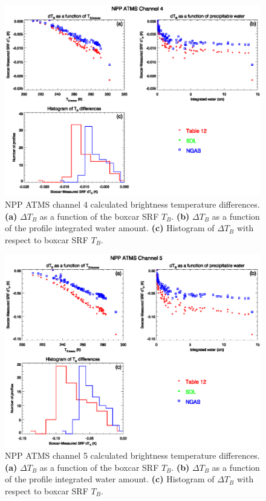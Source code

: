\begin{figure}[H]
  \centering
  \includegraphics[scale=1]{graphics/dtb/atms_npp.ch4.TbStats.eps}
  \caption{NPP ATMS channel 4 calculated brightness temperature differences. \textbf{(a)} $\Delta T_B$ as a function of the boxcar SRF $T_B$. \textbf{(b)} $\Delta T_B$ as a function of the profile integrated water amount. \textbf{(c)} Histogram of $\Delta T_B$ with respect to boxcar SRF $T_B$.}
  \label{fig:atms_npp.ch4.dtb}
\end{figure}

\begin{figure}[H]
  \centering
  \includegraphics[scale=1]{graphics/dtb/atms_npp.ch5.TbStats.eps}
  \caption{NPP ATMS channel 5 calculated brightness temperature differences. \textbf{(a)} $\Delta T_B$ as a function of the boxcar SRF $T_B$. \textbf{(b)} $\Delta T_B$ as a function of the profile integrated water amount. \textbf{(c)} Histogram of $\Delta T_B$ with respect to boxcar SRF $T_B$.}
  \label{fig:atms_npp.ch5.dtb}
\end{figure}

